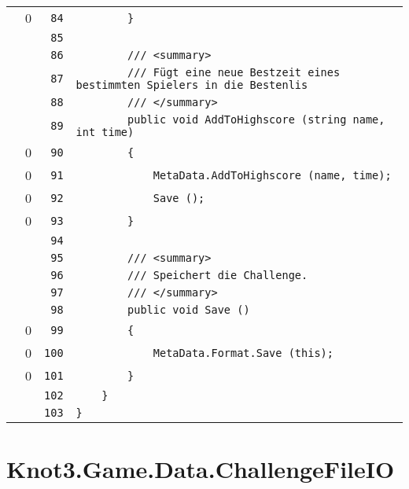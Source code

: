 \documentclass[a4paper,10pt]{article}
\begin{document}
\begin{longtable}[l]{lrrl}
\cellcolor{red} & 0 & \verb~84~ & \verb~        }~\\
\cellcolor{gray} &  & \verb~85~ & \verb~~\\
\cellcolor{gray} &  & \verb~86~ & \verb~        /// <summary>~\\
\cellcolor{gray} &  & \verb~87~ & \verb~        /// Fügt eine neue Bestzeit eines bestimmten Spielers in die Bestenlis~\\
\cellcolor{gray} &  & \verb~88~ & \verb~        /// </summary>~\\
\cellcolor{gray} &  & \verb~89~ & \verb~        public void AddToHighscore (string name, int time)~\\
\cellcolor{red} & 0 & \verb~90~ & \verb~        {~\\
\cellcolor{red} & 0 & \verb~91~ & \verb~            MetaData.AddToHighscore (name, time);~\\
\cellcolor{red} & 0 & \verb~92~ & \verb~            Save ();~\\
\cellcolor{red} & 0 & \verb~93~ & \verb~        }~\\
\cellcolor{gray} &  & \verb~94~ & \verb~~\\
\cellcolor{gray} &  & \verb~95~ & \verb~        /// <summary>~\\
\cellcolor{gray} &  & \verb~96~ & \verb~        /// Speichert die Challenge.~\\
\cellcolor{gray} &  & \verb~97~ & \verb~        /// </summary>~\\
\cellcolor{gray} &  & \verb~98~ & \verb~        public void Save ()~\\
\cellcolor{red} & 0 & \verb~99~ & \verb~        {~\\
\cellcolor{red} & 0 & \verb~100~ & \verb~            MetaData.Format.Save (this);~\\
\cellcolor{red} & 0 & \verb~101~ & \verb~        }~\\
\cellcolor{gray} &  & \verb~102~ & \verb~    }~\\
\cellcolor{gray} &  & \verb~103~ & \verb~}~\\
\end{longtable}
\newpage
\section{Knot3.Game.Data.ChallengeFileIO}
\end{document}
